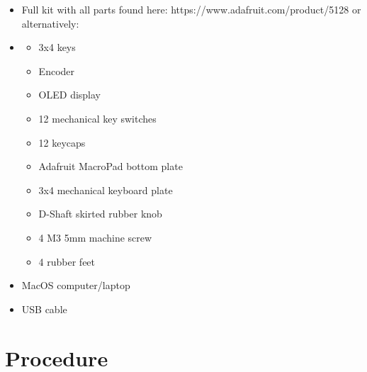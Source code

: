 \documentclass{article}
\begin{document}
\begin{itemize}
    \item Full kit with all parts found here: https://www.adafruit.com/product/5128 or alternatively:
    \item
        \begin{itemize}
            \item 3x4 keys
            \item Encoder
            \item OLED display
            \item 12 mechanical key switches
            \item 12 keycaps
            \item Adafruit MacroPad bottom plate
            \item 3x4 mechanical keyboard plate
            \item D-Shaft skirted rubber knob
            \item 4 M3 5mm machine screw
            \item 4 rubber feet
        \end{itemize}
    \item MacOS computer/laptop
    \item USB cable
\end{itemize}

\section{Procedure}
\end{document}
